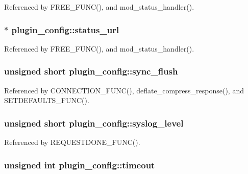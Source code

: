 Referenced by F\-R\-E\-E\-\_\-\-F\-U\-N\-C(), and mod\-\_\-status\-\_\-handler().

\hypertarget{structplugin__config_a44b94ae3dac658262e9900c15f20c185}{
\subsubsection[{status\-\_\-url}]{$\ast$ plugin\-\_\-config\-::status\-\_\-url}}\label{structplugin__config_a44b94ae3dac658262e9900c15f20c185}


Referenced by F\-R\-E\-E\-\_\-\-F\-U\-N\-C(), and mod\-\_\-status\-\_\-handler().

\hypertarget{structplugin__config_af474def361a549cc0b8e719d4af2fc68}{
\subsubsection[{sync\-\_\-flush}]{\setlength{\rightskip}{0pt plus 5cm}unsigned short plugin\-\_\-config\-::sync\-\_\-flush}}\label{structplugin__config_af474def361a549cc0b8e719d4af2fc68}


Referenced by C\-O\-N\-N\-E\-C\-T\-I\-O\-N\-\_\-\-F\-U\-N\-C(), deflate\-\_\-compress\-\_\-response(), and S\-E\-T\-D\-E\-F\-A\-U\-L\-T\-S\-\_\-\-F\-U\-N\-C().

\hypertarget{structplugin__config_acbb7b526b9c8757f94957436a5ddcaf3}{
\subsubsection[{syslog\-\_\-level}]{\setlength{\rightskip}{0pt plus 5cm}unsigned short plugin\-\_\-config\-::syslog\-\_\-level}}\label{structplugin__config_acbb7b526b9c8757f94957436a5ddcaf3}


Referenced by R\-E\-Q\-U\-E\-S\-T\-D\-O\-N\-E\-\_\-\-F\-U\-N\-C().

\hypertarget{structplugin__config_a0075ba20f2b1935b3731eb583a5b0052}{
\subsubsection[{timeout}]{\setlength{\rightskip}{0pt plus 5cm}unsigned int plugin\-\_\-config\-::timeout}}\label{structplugin__config_a0075ba20f2b1935b3731eb583a5b0052}


